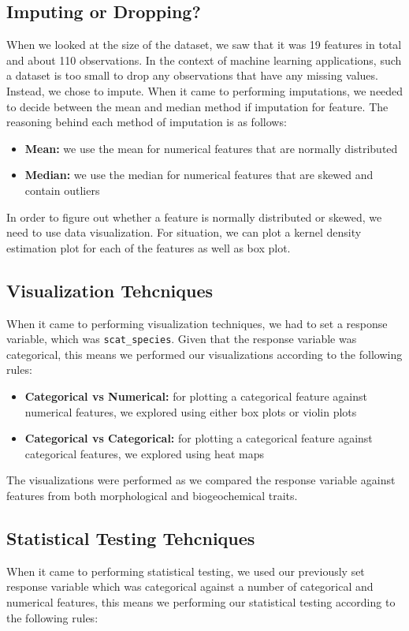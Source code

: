 \documentclass[a4paper]{article}
\begin{document}
\subsection{Imputing or Dropping?}
When we looked at the size of the dataset, we saw that it was 19 features in total and about 110 observations. In the context of machine learning 
applications, such a dataset is too small to drop any observations that have any missing values. Instead, we chose to impute. When it came to performing
imputations, we needed to decide between the mean and median method if imputation for feature. The reasoning behind each method of imputation is as follows:

\begin{itemize}
    \item \textbf{Mean:} we use the mean for numerical features that are normally distributed
    \item \textbf{Median:} we use the median for numerical features that are skewed and contain outliers
\end{itemize}

\noindent In order to figure out whether a feature is normally distributed or skewed, we need to use data visualization. For situation, we can plot a kernel
density estimation plot for each of the features as well as box plot.

\subsection{Visualization Tehcniques}
When it came to performing visualization techniques, we had to set a response variable, which was \texttt{scat\_species}. Given that the response variable
was categorical, this means we performed our visualizations according to the following rules:

\begin{itemize}
    \item \textbf{Categorical vs Numerical:} for plotting a categorical feature against numerical features, we explored using either box plots or violin plots
    \item \textbf{Categorical vs Categorical:} for plotting a categorical feature against categorical features, we explored using heat maps
\end{itemize}

\noindent The visualizations were performed as we compared the response variable against features from both morphological and biogeochemical traits.

\subsection{Statistical Testing Tehcniques}
When it came to performing statistical testing, we used our previously set response variable which was categorical against a number of categorical and
numerical features, this means we performing our statistical testing according to the following rules:
\end{document}
